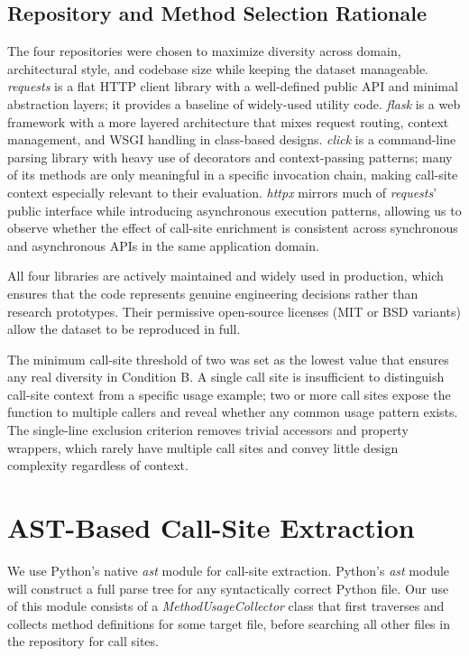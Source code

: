 \documentclass[12pt]{report}
\begin{document}
\subsection{Repository and Method Selection Rationale}

The four repositories were chosen to maximize diversity across domain, architectural style, and codebase size while keeping the dataset manageable. \textit{requests} is a flat HTTP client library with a well-defined public API and minimal abstraction layers; it provides a baseline of widely-used utility code. \textit{flask} is a web framework with a more layered architecture that mixes request routing, context management, and WSGI handling in class-based designs. \textit{click} is a command-line parsing library with heavy use of decorators and context-passing patterns; many of its methods are only meaningful in a specific invocation chain, making call-site context especially relevant to their evaluation. \textit{httpx} mirrors much of \textit{requests}' public interface while introducing asynchronous execution patterns, allowing us to observe whether the effect of call-site enrichment is consistent across synchronous and asynchronous APIs in the same application domain.

All four libraries are actively maintained and widely used in production, which ensures that the code represents genuine engineering decisions rather than research prototypes. Their permissive open-source licenses (MIT or BSD variants) allow the dataset to be reproduced in full.

The minimum call-site threshold of two was set as the lowest value that ensures any real diversity in Condition B. A single call site is insufficient to distinguish call-site context from a specific usage example; two or more call sites expose the function to multiple callers and reveal whether any common usage pattern exists. The single-line exclusion criterion removes trivial accessors and property wrappers, which rarely have multiple call sites and convey little design complexity regardless of context.

\section{AST-Based Call-Site Extraction}

We use Python's native \textit{ast} module for call-site extraction. Python's \textit{ast} module will construct a full parse tree for any syntactically correct Python file. Our use of this module consists of a \textit{MethodUsageCollector} class that first traverses and collects method definitions for some target file, before searching all other files in the repository for call sites.
\end{document}
